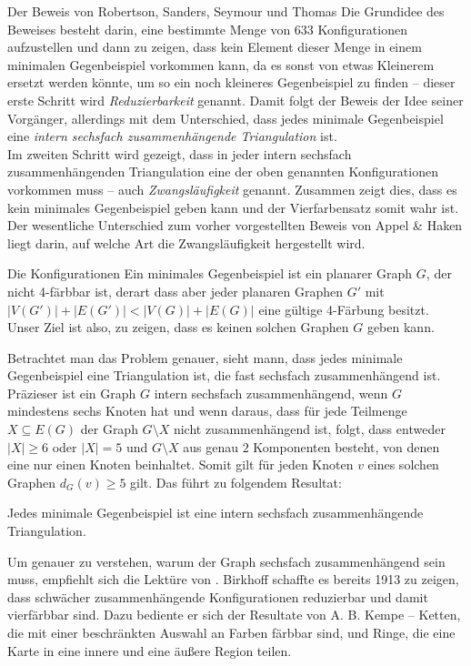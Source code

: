 \begin{chapter}{Der Beweis von Robertson, Sanders, Seymour und Thomas}
  Die Grundidee des Beweises besteht darin, eine bestimmte Menge von 633 Konfigurationen aufzustellen und dann zu zeigen, dass kein Element dieser Menge in einem minimalen Gegenbeispiel vorkommen kann, da es sonst von etwas Kleinerem ersetzt werden könnte, um so ein noch kleineres Gegenbeispiel zu finden -- dieser erste Schritt wird \textit{Reduzierbarkeit} genannt. Damit folgt der Beweis der Idee seiner Vorgänger, allerdings mit dem Unterschied, dass jedes minimale Gegenbeispiel eine \textit{intern sechsfach zusammenhängende Triangulation} ist. \\
  Im zweiten Schritt wird gezeigt, dass in jeder intern sechsfach zusammenhängenden Triangulation eine der oben genannten Konfigurationen vorkommen muss -- auch \textit{Zwangsläufigkeit} genannt. Zusammen zeigt dies, dass es kein minimales Gegenbeispiel geben kann und der Vierfarbensatz somit wahr ist. \\
  Der wesentliche Unterschied zum vorher vorgestellten Beweis von Appel \& Haken liegt darin, auf welche Art die Zwangsläufigkeit hergestellt wird.
  
  \begin{section}{Die Konfigurationen}
   Ein minimales Gegenbeispiel ist ein planarer Graph $G$, der nicht 4-färbbar ist, derart dass aber jeder planaren Graphen $G'$ mit $|V(G')| + |E(G')| < |V(G)| + |E(G)|$ eine gültige 4-Färbung besitzt. Unser Ziel ist also, zu zeigen, dass es keinen solchen Graphen $G$ geben kann. 
   
   Betrachtet man das Problem genauer, sieht mann, dass jedes minimale Gegenbeispiel eine Triangulation ist, die fast sechsfach zusammenhängend ist. Präzieser ist ein Graph $G$ intern sechsfach zusammenhängend, wenn $G$ mindestens sechs Knoten hat und wenn daraus, dass für jede Teilmenge $X \subseteq E(G)$ der Graph $G\setminus X$ nicht zusammenhängend ist, folgt, dass entweder $|X| \geq 6$ oder $|X| = 5$ und $G\setminus X$ aus genau $2$ Komponenten besteht, von denen eine nur einen Knoten beinhaltet. Somit gilt für jeden Knoten $v$ eines solchen Graphen $d_G(v) \geq 5$ gilt. Das führt zu folgendem Resultat:
  
  \begin{satz}
   Jedes minimale Gegenbeispiel ist eine intern sechsfach zusammenhängende Triangulation. 
  \end{satz}

  Um genauer zu verstehen, warum der Graph sechsfach zusammenhängend sein muss, empfiehlt sich die Lektüre von \cite{AmJMath35}. Birkhoff schaffte es bereits 1913 zu zeigen, dass schwächer zusammenhängende Konfigurationen reduzierbar und damit vierfärbbar sind. Dazu bediente er sich der Resultate von A. B. Kempe -- Ketten, die mit einer beschränkten Auswahl an Farben färbbar sind, und Ringe, die eine Karte in eine innere und eine äußere Region teilen. 
  

\end{section}
\end{chapter}
